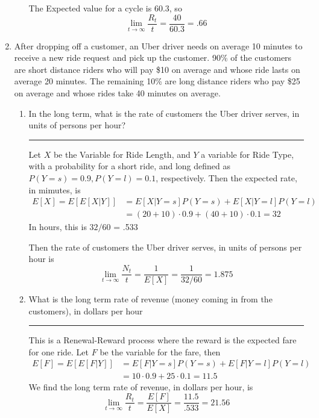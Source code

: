\documentclass{article} %
\theoremstyle{plain}
\theoremstyle{case}
\begin{document}
\begin{enumerate}[label={\fbox{\textbf{Exercise \#\arabic* :}}}]
\begin{enumerate}
       The Expected value for a cycle is 60.3,
       so
       \[ \lim_{t \to \infty} \frac{R_t}{t} = \frac{40}{60.3} = .66 \]
    \end{enumerate}
  \newpage
  \item After dropping off a customer, an Uber driver needs on average 10
    minutes to receive a new ride request and pick up the customer.
    90\% of the customers are short distance riders who will pay
    \$10 on average and whose ride lasts on average 20 minutes.
    The remaining 10\% are long distance riders who pay \$25 on
    average and whose rides take 40 minutes on average.
    \begin{enumerate}
      \item In the long term, what is the rate of customers the Uber driver serves, in units of persons per hour?
\par\noindent\rule{\textwidth}{0.1pt}
        Let $X$ be the Variable for Ride Length, and $Y$ a variable for
        Ride Type, with a probability for a short ride, and long 
        defined as $P(Y=s) = 0.9, P(Y=l) = 0.1$, respectively.  Then
        the expected rate, in mimutes, is
       \begin{align*}
         E[X] = E[E[X|Y]] &= E[X|Y=s]P(Y=s) + E[X|Y=l]P(Y=l)   \\
                          &= (20+10) \cdot 0.9 + (40+10) \cdot 0.1 = 32
       \end{align*}
       In hours, this is $32/60$ = .533

       Then the rate of customers the Uber driver serves, in units of persons per hour is
       \[ \lim_{t \to \infty} \frac{N_t}{t}  = \frac{1}{E[X]}  = \frac{1}{32/60} = 1.875 \]
     \item What is the long term rate of revenue (money coming in from the customers), in dollars per hour
\par\noindent\rule{\textwidth}{0.1pt}
        This is a Renewal-Reward process where the reward is the expected
        fare for one ride.  Let $F$ be the variable for the fare, then
       \begin{align*}
         E[F] = E[E[F|Y]] &= E[F|Y=s]P(Y=s) + E[F|Y=l]P(Y=l)   \\
                          &= 10 \cdot 0.9 + 25 \cdot 0.1 = 11.5
       \end{align*}
        We find the long term rate of revenue, in dollars per hour, is
        \[ \lim_{t \to \infty} \frac{R_t}{t} = \frac{E[F]}{E[X]} = \frac{11.5}{.533} = 21.56 \]
    \end{enumerate}


\end{enumerate}
\end{document}

